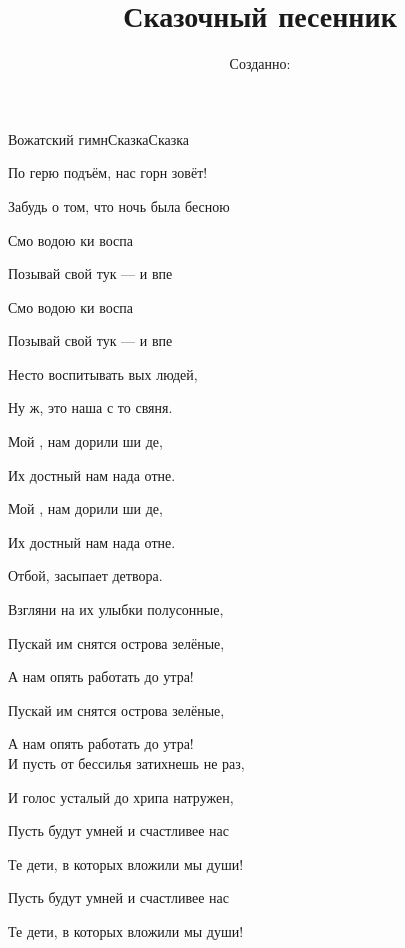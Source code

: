 \documentclass[11pt,a5paper]{book}
\title{ Сказочный песенник}
\author{}
\date{Созданно:  \RevDate}
\begin{document}
 
\maketitle

\mainmatter


\begin{song}{Вожатский гимн}{}{Сказка}{Сказка}{}{}

	По герю подъём, нас горн зовёт!\par
	Забудь о том, что ночь была бесною\par
    Смо водою ки воспа\par    
    Позывай свой тук — и впе\par
    Смо водою ки воспа\par    
    Позывай свой тук — и впе\par
    
	\begin{SBOpGroup}
Несто воспитывать вых людей,\par
Ну  ж, это наша с то свяня.\par
Мой , нам дорили ши де,\par
Их достный  нам нада отне.\par
Мой , нам дорили ши де,\par
Их достный  нам нада отне.\par
\end{SBOpGroup}

Отбой, засыпает детвора.\par
Взгляни на их улыбки полусонные,\par
Пускай им снятся острова зелёные,\par
А нам опять работать до утра!\par
Пускай им снятся острова зелёные,\par
А нам опять работать до утра!\\

И пусть от бессилья затихнешь не раз,\par
И голос усталый до хрипа натружен,\par
Пусть будут умней и счастливее нас\par
Те дети, в которых вложили мы души!\par
Пусть будут умней и счастливее нас\par
Те дети, в которых вложили мы души!

\end{song}
\end{document}
